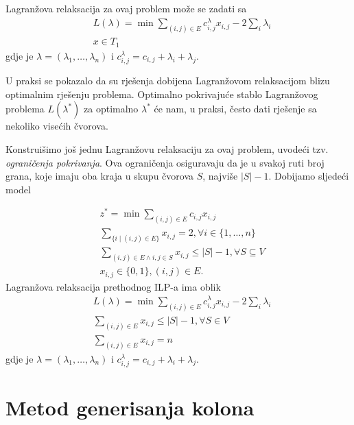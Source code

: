 \documentclass[a4paper, utf8, 11pt, colorlinks]{book}
\theoremstyle{definition}
\begin{document}
Lagranžova relaksacija za ovaj problem može se zadati sa 
\begin{align*}
     &L(\lambda) = \min \sum_{(i,j)\in E} c^\lambda_{i,j} x_{i,j} - 2 \sum_{i} \lambda_i \\
     & x \in T_1
\end{align*}
gdje je $\lambda=(\lambda_1, \ldots, \lambda_n)$ i $c^\lambda_{i,j} = c_{i,j} + \lambda_i + \lambda_j$. 

U praksi se pokazalo da su rješenja dobijena Lagranžovom relaksacijom blizu optimalnim rješenju problema. Optimalno pokrivajuće stablo Lagranžovog problema $L(\lambda^*)$ za optimalno $\lambda^*$ će nam,  u praksi, često dati rješenje sa  nekoliko visećih čvorova. 

Konstruišimo još jednu Lagranžovu relaksaciju za ovaj problem,  uvodeći tzv. \emph{ograničenja pokrivanja}. Ova ograničenja osiguravaju da je u svakoj ruti broj grana, koje imaju oba kraja u skupu čvorova $S$, najviše $|S|-1$. Dobijamo sljedeći model 

\begin{align*}
     & z^* = \min \sum_{(i,j)\in E} c_{i,j} x_{i,j} \\
     & \sum_{ \{ i \mid (i,j) \in E \} } x_{i,j} = 2, \forall i \in \{1,\ldots, n \} \\
     & \sum_{(i,j) \in E  \wedge i,j \in S} x_{i,j} \leq |S|-1, \forall S \subseteq V \\
     & x_{i,j} \in \{0, 1 \}, (i,j)\in E.
\end{align*}
Lagranžova relaksacija prethodnog ILP-a ima oblik 
\begin{align*}
 &L(\lambda) = \min \sum_{(i,j)\in E} c^\lambda_{i,j} x_{i,j} - 2 \sum_{i} \lambda_i \\
 & \sum_{(i,j) \in E} x_{i,j} \leq |S|-1, \forall S \in V \\
 & \sum_{(i,j) \in E} x_{i,j} = n
\end{align*}
gdje je $\lambda=(\lambda_1, \ldots, \lambda_n)$ i $c^\lambda_{i,j} = c_{i,j} + \lambda_i + \lambda_j$. 

\section{Metod generisanja kolona}%
\end{document}
